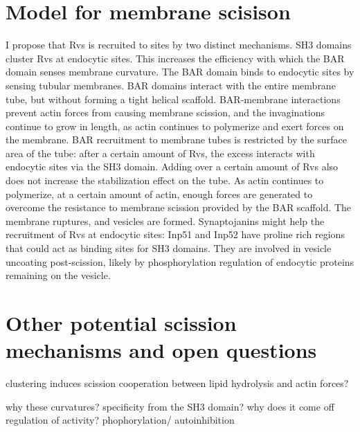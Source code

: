 \section{Model for membrane scisison}
I propose that Rvs is recruited to sites by two distinct mechanisms. SH3 domains cluster Rvs at endocytic sites. This increases the efficiency with which the BAR domain senses membrane curvature. The BAR domain binds to endocytic sites by sensing tubular membranes. BAR domains interact with the entire membrane tube, but without forming a tight helical scaffold. BAR-membrane interactions prevent actin forces from causing membrane scission, and the invaginations continue to grow in length, as actin continues to polymerize and exert forces on the membrane. BAR recruitment to membrane tubes is restricted by the surface area of the tube: after a certain amount of Rvs, the excess interacts with endocytic sites via the SH3 domain. Adding over a certain amount of Rvs also does not increase the stabilization effect on the tube. As actin continues to polymerize, at a certain amount of actin, enough forces are generated to overcome the resistance to membrane scission provided by the BAR scaffold. The membrane ruptures, and vesicles are formed. Synaptojanins might help the recruitment of Rvs at endocytic sites: Inp51 and Inp52 have proline rich regions that could act as binding sites for SH3 domains. They are involved in vesicle uncoating post-scission, likely by phosphorylation regulation of endocytic proteins remaining on the vesicle. 


\section{Other potential scission mechanisms and open questions}

clustering induces scission 
cooperation between lipid hydrolysis and actin forces?


why these curvatures? specificity from the SH3 domain?
why does it come off
regulation of activity? phophorylation/ autoinhibition
